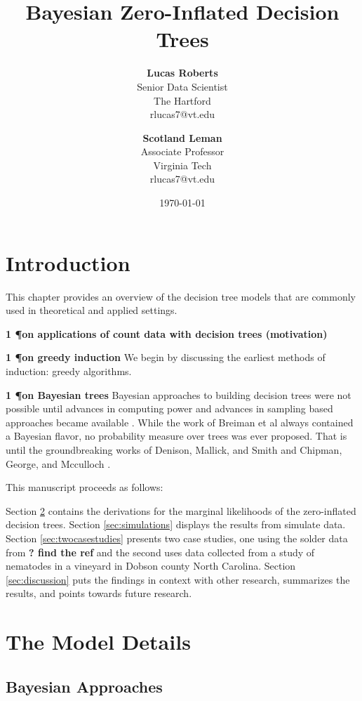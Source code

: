 \documentclass{article}
\title{{\bf Bayesian Zero-Inflated Decision Trees} \\ }
\author{ {\bf Lucas Roberts}  \\
Senior Data Scientist \\
The Hartford \\
{\small rlucas7@vt.edu}
}
\author{ {\bf Scotland Leman}  \\
Associate Professor \\
Virginia Tech \\
{\small rlucas7@vt.edu}
}
\date{\today}
\begin{document}
\maketitle


\section{Introduction}
\label{ch:preliminaries}
This chapter provides an overview of the decision tree models that are commonly used in theoretical and applied settings. 

\textbf{1 \P on applications of count data with decision trees (motivation)}

\textbf{1 \P on greedy induction }We begin by discussing the earliest methods of induction: greedy algorithms. 

\textbf{1 \P on Bayesian trees }Bayesian approaches to building decision trees were not possible until advances in computing power and advances in sampling based approaches became available \cite{gelfand1990sampling}. While the work of Breiman et al \cite{breiman1984classification} always contained a Bayesian flavor, no probability measure over trees was ever proposed. That is until the groundbreaking works of Denison, Mallick, and Smith \cite{denison1998bayesian} and Chipman, George, and Mcculloch \cite{chipman1998bayesian}.

This manuscript proceeds as follows: 

Section \ref{sec:derivations} contains the derivations for the marginal likelihoods of the zero-inflated decision trees. 
Section \ref{sec:simulations} displays the results from simulate data. 
Section \ref{sec:twocasestudies} presents two case studies, one using the solder data from \textbf{? find the ref}  \cite{}  and the second uses data collected from a study of nematodes in a vineyard in Dobson county North Carolina. 
Section \ref{sec:discussion} puts the findings in context with other research, summarizes the results, and points towards future research. 

\section{The Model Details}
\label{sec:derivations}

\subsection{Bayesian Approaches}
\label{ch:p2sub_bayes}
\end{document}
